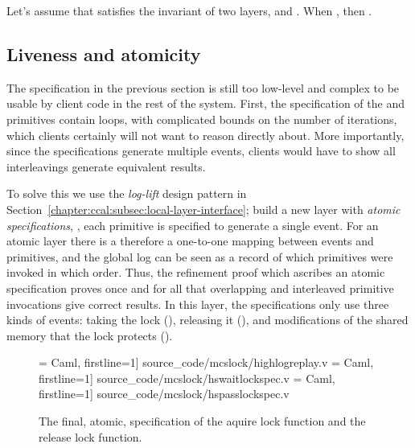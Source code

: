 \begin{theorem} 
    Let's assume that   satisfies the invariant of two layers,
     and . When 
, then .
\end{theorem}


\subsection{Liveness and atomicity}
\label{chapter:mcslock:sec:liveness-atomicity}

The specification in the previous section is still too low-level and
complex to be usable by client code in the rest of the system.  First,
the specification of the  and
 primitives contain loops, with complicated
bounds on the number of iterations, which clients certainly will not
want to reason directly about.  More importantly, since the
specifications generate multiple events, clients would have to show
all interleavings generate equivalent results.

To solve this we use the \textit{log-lift} design
pattern in Section~\ref{chapter:ccal:subsec:local-layer-interface}; build a new layer with \emph{atomic specifications},
\ie, each primitive is specified to generate  a single event.
For an atomic layer there is a
therefore a one-to-one mapping between events and primitives, and the global log
can be seen as a record of which primitives were invoked in which
order. Thus, the refinement proof which ascribes an atomic
specification proves once and for all that overlapping and interleaved
primitive invocations give correct results.
In this layer, the specifications only use three kinds 
of events: taking the lock (),
releasing it (), and modifications of the shared
memory that the lock protects ().



\begin{figure}
 = Caml, firstline=1] {source_code/mcslock/highlogreplay.v}
 = Caml, firstline=1] {source_code/mcslock/hswaitlockspec.v}
 = Caml, firstline=1] {source_code/mcslock/hspasslockspec.v}
\caption{The final, atomic, specification of the aquire lock function and the release lock function.}
\label{fig:chapter:mcslock:hswaitlockspec}
\end{figure}

